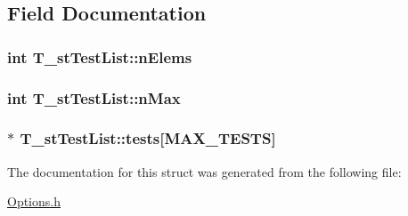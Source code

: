 \subsection{Field Documentation}
\hypertarget{structT__stTestList_a3c0aa528e2fcb76dee4bfed8cc6af283}{
\subsubsection[{n\-Elems}]{\setlength{\rightskip}{0pt plus 5cm}int T\-\_\-st\-Test\-List\-::n\-Elems}}\label{structT__stTestList_a3c0aa528e2fcb76dee4bfed8cc6af283}
\hypertarget{structT__stTestList_a957fc1ce837a0da88887b9fd92aed436}{
\subsubsection[{n\-Max}]{\setlength{\rightskip}{0pt plus 5cm}int T\-\_\-st\-Test\-List\-::n\-Max}}\label{structT__stTestList_a957fc1ce837a0da88887b9fd92aed436}
\hypertarget{structT__stTestList_a73e25f5a90fc3e8c56dc5bdfb3a94495}{
\subsubsection[{tests}]{$\ast$ T\-\_\-st\-Test\-List\-::tests\mbox{[}{\bf M\-A\-X\-\_\-\-T\-E\-S\-T\-S}\mbox{]}}}\label{structT__stTestList_a73e25f5a90fc3e8c56dc5bdfb3a94495}


The documentation for this struct was generated from the following file\-:\begin{DoxyCompactItemize}
\item 
\hyperlink{Options_8h}{Options.\-h}\end{DoxyCompactItemize}
